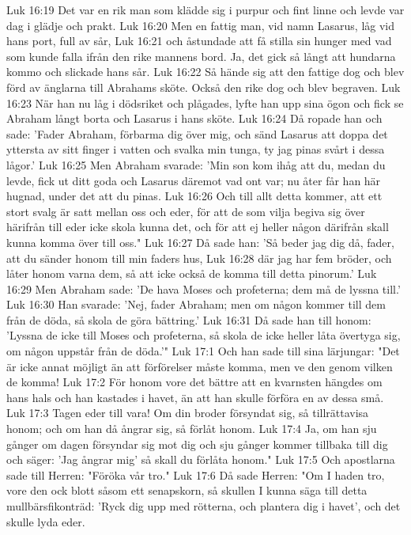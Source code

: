 Luk 16:19  Det var en rik man som klädde sig i purpur och fint linne och levde var dag i glädje och prakt.
Luk 16:20  Men en fattig man, vid namn Lasarus, låg vid hans port, full av sår,
Luk 16:21  och åstundade att få stilla sin hunger med vad som kunde falla ifrån den rike mannens bord. Ja, det gick så långt att hundarna kommo och slickade hans sår.
Luk 16:22  Så hände sig att den fattige dog och blev förd av änglarna till Abrahams sköte. Också den rike dog och blev begraven.
Luk 16:23  När han nu låg i dödsriket och plågades, lyfte han upp sina ögon och fick se Abraham långt borta och Lasarus i hans sköte.
Luk 16:24  Då ropade han och sade: 'Fader Abraham, förbarma dig över mig, och sänd Lasarus att doppa det yttersta av sitt finger i vatten och svalka min tunga, ty jag pinas svårt i dessa lågor.'
Luk 16:25  Men Abraham svarade: 'Min son kom ihåg att du, medan du levde, fick ut ditt goda och Lasarus däremot vad ont var; nu åter får han här hugnad, under det att du pinas.
Luk 16:26  Och till allt detta kommer, att ett stort svalg är satt mellan oss och eder, för att de som vilja begiva sig över härifrån till eder icke skola kunna det, och för att ej heller någon därifrån skall kunna komma över till oss."
Luk 16:27  Då sade han: 'Så beder jag dig då, fader, att du sänder honom till min faders hus,
Luk 16:28  där jag har fem bröder, och låter honom varna dem, så att icke också de komma till detta pinorum.'
Luk 16:29  Men Abraham sade: 'De hava Moses och profeterna; dem må de lyssna till.'
Luk 16:30  Han svarade: 'Nej, fader Abraham; men om någon kommer till dem från de döda, så skola de göra bättring.'
Luk 16:31  Då sade han till honom: 'Lyssna de icke till Moses och profeterna, så skola de icke heller låta övertyga sig, om någon uppstår från de döda.'"
Luk 17:1  Och han sade till sina lärjungar: "Det är icke annat möjligt än att förförelser måste komma, men ve den genom vilken de komma!
Luk 17:2  För honom vore det bättre att en kvarnsten hängdes om hans hals och han kastades i havet, än att han skulle förföra en av dessa små.
Luk 17:3  Tagen eder till vara! Om din broder försyndat sig, så tillrättavisa honom; och om han då ångrar sig, så förlåt honom.
Luk 17:4  Ja, om han sju gånger om dagen försyndar sig mot dig och sju gånger kommer tillbaka till dig och säger: 'Jag ångrar mig' så skall du förlåta honom."
Luk 17:5  Och apostlarna sade till Herren: "Föröka vår tro."
Luk 17:6  Då sade Herren: "Om I haden tro, vore den ock blott såsom ett senapskorn, så skullen I kunna säga till detta mullbärsfikonträd: 'Ryck dig upp med rötterna, och plantera dig i havet', och det skulle lyda eder.
